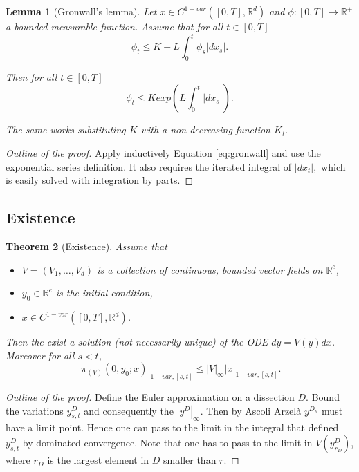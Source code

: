 \documentclass{article}
\newcommand{\R}{\mathbb{R}}
\newtheorem{theorem}{Theorem}
\newtheorem{lemma}[theorem]{Lemma}
\begin{document}
\begin{lemma}[Gronwall's lemma]
    Let $x \in C^{1-var}([0,T], \R^d)$ and $\phi:[0,T] \rightarrow \R^+$ a bounded measurable function. Assume that for all $t \in [0,T]$
    \begin{equation}\label{eq:gronwall}
        \phi_t \leq K + L \int_0^t \phi_s |dx_s|.
    \end{equation}

    Then for all $t \in [0,T]$
    \begin{equation}
        \phi_t \leq K exp(L \int_0^t |dx_s|).
    \end{equation}

    The same works substituting $K$ with a non-decreasing function $K_t.$
\end{lemma}
\begin{proof}[Outline of the proof]
    Apply inductively Equation \eqref{eq:gronwall} and use the exponential series definition.
    It also requires the iterated integral of $|dx_t|,$ which is easily solved with integration by parts.
\end{proof}

\subsection{Existence}

\begin{theorem}[Existence]
    Assume that
    \begin{itemize}
        \item $V = (V_1, \ldots, V_d)$ is a collection of continuous, bounded vector fields on $\R^e$,
        \item $y_0 \in \R^e$ is the initial condition,
        \item $x \in C^{1-var}([0,T], \R^d)$.
    \end{itemize}
    Then the exist a solution (not necessarily unique) of the ODE $dy = V(y)dx$.
    Moreover for all $s < t$,
    \begin{equation}
        |\pi_{(V)}(0, y_0; x)|_{1-var, [s,t]} \leq |V|_\infty |x|_{1-var, [s,t]}.
    \end{equation}
\end{theorem}
\begin{proof}[Outline of the proof]
    Define the Euler approximation on a dissection $D$.
    Bound the variations $y^D_{s,t}$ and consequently the $|y^D|_\infty.$
    Then by Ascoli Arzelà $y^{D_n}$ must have a limit point.
    Hence one can pass to the limit in the integral that defined $y^D_{s,t}$ by dominated convergence.
    Note that one has to pass to the limit in $V(y_{r_D}^D)$, where $r_D$ is the largest element in $D$ smaller than $r.$
\end{proof}
\end{document}
